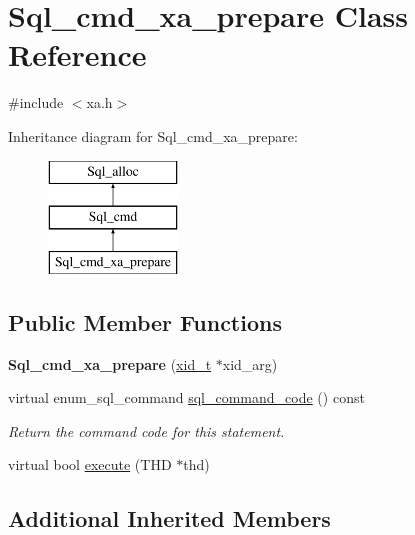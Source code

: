 \hypertarget{classSql__cmd__xa__prepare}{}\section{Sql\+\_\+cmd\+\_\+xa\+\_\+prepare Class Reference}
\label{classSql__cmd__xa__prepare}


{\ttfamily \#include $<$xa.\+h$>$}

Inheritance diagram for Sql\+\_\+cmd\+\_\+xa\+\_\+prepare\+:\begin{figure}[H]
\begin{center}
\leavevmode
\includegraphics[height=3.000000cm]{classSql__cmd__xa__prepare}
\end{center}
\end{figure}
\subsection*{Public Member Functions}
\begin{DoxyCompactItemize}
\item 
\mbox{\label{classSql__cmd__xa__prepare_a85a87b70fd2bd340b66d04b4ff3f7c1d}} 
{\bfseries Sql\+\_\+cmd\+\_\+xa\+\_\+prepare} (\mbox{\hyperlink{structxid__t}{xid\+\_\+t}} $\ast$xid\+\_\+arg)
\item 
\mbox{\label{classSql__cmd__xa__prepare_aa142dfc5575a471ed2ae975e5fcc6883}} 
virtual enum\+\_\+sql\+\_\+command \mbox{\hyperlink{classSql__cmd__xa__prepare_aa142dfc5575a471ed2ae975e5fcc6883}{sql\+\_\+command\+\_\+code}} () const
\begin{DoxyCompactList}\small\item\em Return the command code for this statement. \end{DoxyCompactList}\item 
virtual bool \mbox{\hyperlink{classSql__cmd__xa__prepare_a238c596649cac951d4c839ae253b1624}{execute}} (T\+HD $\ast$thd)
\end{DoxyCompactItemize}
\subsection*{Additional Inherited Members}



